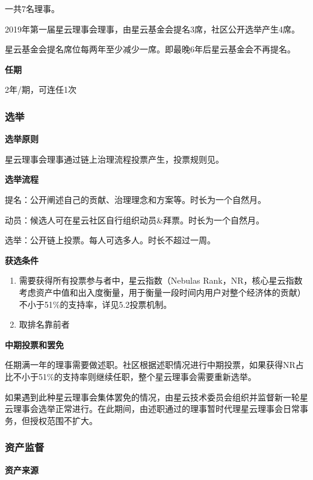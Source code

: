 一共7名理事。

2019年第一届星云理事会理事，由星云基金会提名3席，社区公开选举产生4席。

星云基金会提名席位每两年至少减少一席。即最晚6年后星云基金会不再提名。

\textbf{任期}

2年/期，可连任1次

\subsubsection{选举}
\textbf{选举原则}

星云理事会理事通过链上治理流程投票产生，投票规则见。


\textbf{选举流程}

提名：公开阐述自己的贡献、治理理念和方案等。时长为一个自然月。

动员：候选人可在星云社区自行组织动员\&拜票。时长为一个自然月。

选举：公开链上投票。每人可选多人。时长不超过一周。

\textbf{获选条件} 
\begin{enumerate}
	\item 需要获得所有投票参与者中，星云指数（Nebulas Rank，NR，核心星云指数考虑资产中值和出入度衡量，用于衡量一段时间内用户对整个经济体的贡献）不小于51\%的支持率，详见5.2投票机制。
	\item 取排名靠前者
\end{enumerate}
\textbf{中期投票和罢免}

任期满一年的理事需要做述职。社区根据述职情况进行中期投票，如果获得NR占比不小于51\%的支持率则继续任职，整个星云理事会需要重新选举。

如果遇到此种星云理事会集体罢免的情况，由星云技术委员会组织并监督新一轮星云理事会选举正常进行。在此期间，由述职通过的理事暂时代理星云理事会日常事务，但授权范围不扩大。

\subsubsection{资产监督}
\textbf{资产来源}

